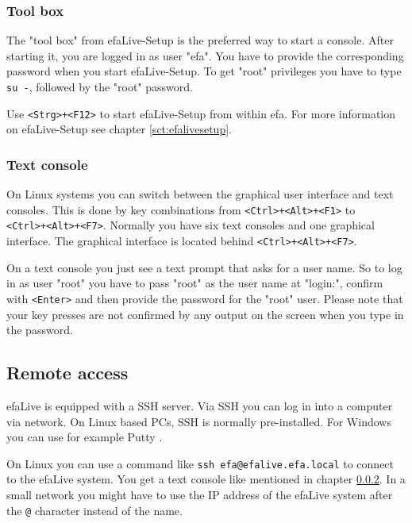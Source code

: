 \documentclass[a4paper,12pt,twoside]{article}
\begin{document}
\subsubsection{Tool box}
\label{sct:toolbox}
The "tool box" from efaLive-Setup is the preferred way to start a
console. After starting it, you are logged in as user
"efa". You have to provide the
corresponding password when you start efaLive-Setup. To get
"root" privileges you have to type
\texttt{su -}, followed by the
"root" password.

Use \texttt{{\textless}Strg{\textgreater}+{\textless}F12{\textgreater}} to start
efaLive-Setup from within efa. For more information on efaLive-Setup
see chapter \ref{sct:efalivesetup}.

\subsubsection{Text console}
\label{sct:text_console}
On Linux systems you can switch
between the graphical user interface and text consoles. This is done by
key combinations from
\texttt{{\textless}Ctrl{\textgreater}+{\textless}Alt{\textgreater}+{\textless}F1{\textgreater}} to\\
\texttt{{\textless}Ctrl{\textgreater}+{\textless}Alt{\textgreater}+{\textless}F7{\textgreater}}.
Normally you have six text consoles and one graphical interface. The graphical interface is located behind \texttt{{\textless}Ctrl{\textgreater}+{\textless}Alt{\textgreater}+{\textless}F7{\textgreater}}.

On a text console you just see a text prompt that asks for a user name.
So to log in as user "root" you have to
pass "root" as the user name at
"login:", confirm with
\texttt{{\textless}Enter{\textgreater}} and then provide the password for the
"root" user. Please note that your key
presses are not confirmed by any output on the screen when you type in
the password.


\subsection{Remote access}
\label{sct:remote_access}
efaLive is equipped with a SSH server. Via SSH you can log in into a
computer via network. On Linux based PCs, SSH is normally
pre-installed. For Windows you can use for example Putty \cite{PUT1}.

On Linux you can use a command like \texttt{ssh
efa@efalive.efa.local} to connect to the efaLive system.
You get a text console like mentioned in chapter \ref{sct:text_console}. In a small
network you might have to use the IP address of the efaLive system
after the \texttt{@} character instead of the
name.
\end{document}
